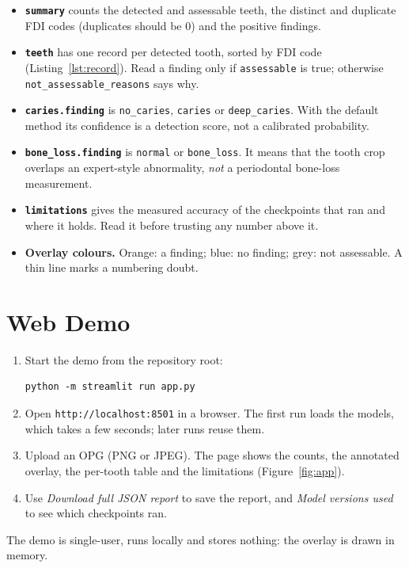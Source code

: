 \begin{itemize}
\item \textbf{\texttt{summary}} counts the detected and assessable teeth, the distinct and duplicate FDI
  codes (duplicates should be 0) and the positive findings.
\item \textbf{\texttt{teeth}} has one record per detected tooth, sorted by FDI code
  (Listing~\ref{lst:record}). Read a finding only if \texttt{assessable} is true; otherwise
  \texttt{not\_assessable\_reasons} says why.
\item \textbf{\texttt{caries.finding}} is \texttt{no\_caries}, \texttt{caries} or \texttt{deep\_caries}.
  With the default method its confidence is a detection score, not a calibrated probability.
\item \textbf{\texttt{bone\_loss.finding}} is \texttt{normal} or \texttt{bone\_loss}. It means that the
  tooth crop overlaps an expert-style abnormality, \emph{not} a periodontal bone-loss measurement.
\item \textbf{\texttt{limitations}} gives the measured accuracy of the checkpoints that ran and where it
  holds. Read it before trusting any number above it.
\item \textbf{Overlay colours.} Orange: a finding; blue: no finding; grey: not assessable. A thin line
  marks a numbering doubt.
\end{itemize}

\section{Web Demo}

\begin{enumerate}[label=\arabic*.,leftmargin=1.6em]
\item Start the demo from the repository root:
\begin{lstlisting}
python -m streamlit run app.py
\end{lstlisting}
\item Open \texttt{http://localhost:8501} in a browser. The first run loads the models, which takes a
  few seconds; later runs reuse them.
\item Upload an OPG (PNG or JPEG). The page shows the counts, the annotated overlay, the per-tooth table
  and the limitations (Figure~\ref{fig:app}).
\item Use \emph{Download full JSON report} to save the report, and \emph{Model versions used} to see
  which checkpoints ran.
\end{enumerate}
The demo is single-user, runs locally and stores nothing: the overlay is drawn in memory.

